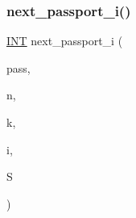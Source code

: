 \subsubsection{\texorpdfstring{next\+\_\+passport\+\_\+i()}{next\_passport\_i()}}
{\footnotesize\ttfamily \mbox{\hyperlink{galois_8h_a09fddde158a3a20bd2dcadb609de11dc}{I\+NT}} next\+\_\+passport\+\_\+i (\begin{DoxyParamCaption}\item[{\mbox{\hyperlink{class_vector}{Vector}} \&}]{pass,  }\item[{\mbox{\hyperlink{galois_8h_a09fddde158a3a20bd2dcadb609de11dc}{I\+NT}}}]{n,  }\item[{\mbox{\hyperlink{galois_8h_a09fddde158a3a20bd2dcadb609de11dc}{I\+NT}}}]{k,  }\item[{\mbox{\hyperlink{galois_8h_a09fddde158a3a20bd2dcadb609de11dc}{I\+NT}}}]{i,  }\item[{\mbox{\hyperlink{galois_8h_a09fddde158a3a20bd2dcadb609de11dc}{I\+NT}} \&}]{S }\end{DoxyParamCaption})}


